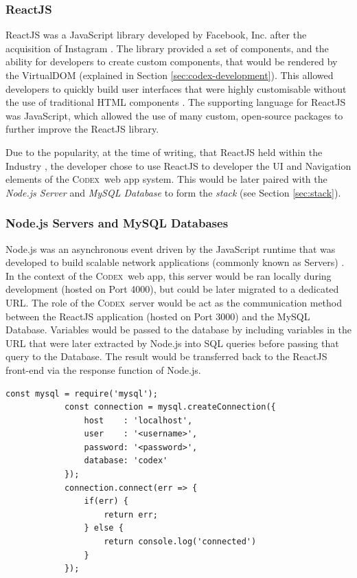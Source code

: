 \documentclass[final]{cmpreport}
\newcommand{\Codex}{\textsc{Codex}}
\begin{document}
			\subsubsection{ReactJS} \label{sec:react-js}
			ReactJS was a JavaScript library developed by Facebook, Inc. after the acquisition of Instagram \citep{ReactJSOfficial}. The library provided a set of components, and the ability for developers to create custom components, that would be rendered by the VirtualDOM (explained in Section \ref{sec:codex-development}). This allowed developers to quickly build user interfaces that were highly customisable without the use of traditional HTML components \citep{MasteringReact}. The supporting language for ReactJS was JavaScript, which allowed the use of many custom, open-source packages to further improve the ReactJS library.  
			
			Due to the popularity, at the time of writing, that ReactJS held within the Industry \citep{ReactJSPopularity}, the developer chose to use ReactJS to developer the UI and Navigation elements of the \Codex \ web app system. This would be later paired with the \textit{Node.js Server} and \textit{MySQL Database} to form the \emph{stack} (see Section \ref{sec:stack}).
			
			\subsubsection{Node.js Servers and MySQL Databases} \label{sec:backend}
			Node.js was an asynchronous event driven by the JavaScript runtime that was developed to build scalable network applications (commonly known as Servers) \citep{nodejsOfficial}. In the context of the \Codex \ web app, this server would be ran locally during development (hosted on Port 4000), but could be later migrated to a dedicated URL. The role of the \Codex \ server would be act as the communication method between the ReactJS application (hosted on Port 3000) and the MySQL Database. Variables would be passed to the database by including variables in the URL that were later extracted by Node.js into SQL queries before passing that query to the Database. The result would be transferred back to the ReactJS front-end via the response function of Node.js.
			
			\begin{lstlisting}[caption={Node.js source code which was used to connect the Node.js Sever to the MySQL Database, forming the back-end of the application.}, label={cod:db-connect}]
			const mysql = require('mysql');
			const connection = mysql.createConnection({
				host	: 'localhost',
				user	: '<username>',
				password: '<password>',
				database: 'codex'	
			});
			connection.connect(err => {
				if(err) {
					return err;
				} else {
					return console.log('connected')
				}
			});
			\end{lstlisting}
			
\end{document}
